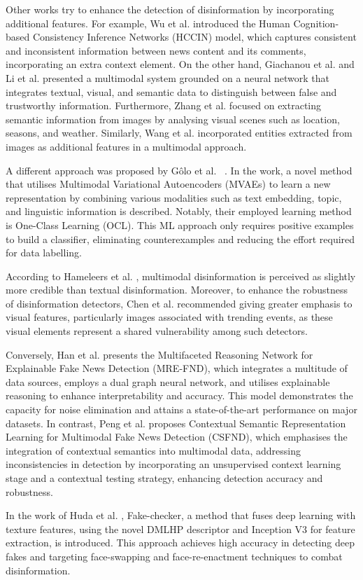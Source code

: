 Other works try to enhance the detection of disinformation by incorporating additional features. For example, Wu et al. \cite{Wu2023} introduced the Human Cognition-based Consistency Inference Networks (HCCIN) model, which captures consistent and inconsistent information between news content and its comments, incorporating an extra context element. On the other hand, Giachanou et al. \cite{Giachanou2020} and Li et al. \cite{Li2022} presented a multimodal system grounded on a neural network that integrates textual, visual, and semantic data to distinguish between false and trustworthy information. Furthermore, Zhang et al. \cite{Zhang2022} focused on extracting semantic information from images by analysing visual scenes such as location, seasons, and weather. Similarly, Wang et al. \cite{Wang2023} incorporated entities extracted from images as additional features in a multimodal approach.

A different approach was proposed by Gôlo et al. ~\cite{Silva2023}. In the work, a novel method that utilises Multimodal Variational Autoencoders (MVAEs) to learn a new representation by combining various modalities such as text embedding, topic, and linguistic information is described. Notably, their employed learning method is One-Class Learning (OCL). This ML approach only requires positive examples to build a classifier, eliminating counterexamples and reducing the effort required for data labelling.

According to Hameleers et al. \cite{Hameleers2020}, multimodal disinformation is perceived as slightly more credible than textual disinformation. Moreover, to enhance the robustness of disinformation detectors, Chen et al. \cite{Chen2023} recommended giving greater emphasis to visual features, particularly images associated with trending events, as these visual elements represent a shared vulnerability among such detectors.

Conversely, Han et al. \cite{Han2024} presents the Multifaceted Reasoning Network for Explainable Fake News Detection (MRE-FND), which integrates a multitude of data sources, employs a dual graph neural network, and utilises explainable reasoning to enhance interpretability and accuracy. This model demonstrates the capacity for noise elimination and attains a state-of-the-art performance on major datasets. In contrast, Peng et al. \cite{Peng2024} proposes Contextual Semantic Representation Learning for Multimodal Fake News Detection (CSFND), which emphasises the integration of contextual semantics into multimodal data, addressing inconsistencies in detection by incorporating an unsupervised context learning stage and a contextual testing strategy, enhancing detection accuracy and robustness.

In the work of Huda et al. \cite{Huda2024}, Fake-checker, a method that fuses deep learning with texture features, using the novel DMLHP descriptor and Inception V3 for feature extraction, is introduced. This approach achieves high accuracy in detecting deep fakes and targeting face-swapping and face-re-enactment techniques to combat disinformation.